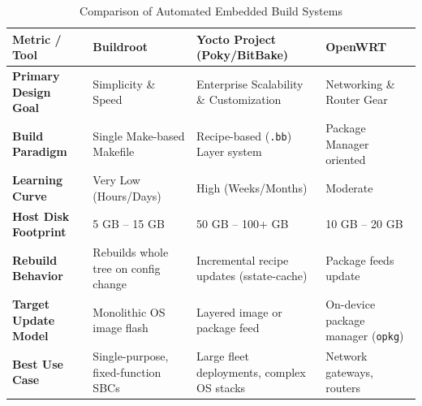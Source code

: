 \begin{table}[h!]
\centering
\caption{Comparison of Automated Embedded Build Systems}
\label{tab:build_tools}
\small
\begin{tabularx}{\textwidth}{l X X X}
\toprule
\textbf{Metric / Tool} & \textbf{Buildroot} & \textbf{Yocto Project (Poky/BitBake)} & \textbf{OpenWRT} \\
\midrule
\textbf{Primary Design Goal} & Simplicity \& Speed & Enterprise Scalability \& Customization & Networking \& Router Gear \\
\textbf{Build Paradigm} & Single Make-based Makefile & Recipe-based (\texttt{.bb}) Layer system & Package Manager oriented \\
\textbf{Learning Curve} & Very Low (Hours/Days) & High (Weeks/Months) & Moderate \\
\textbf{Host Disk Footprint} & 5 GB -- 15 GB & 50 GB -- 100+ GB & 10 GB -- 20 GB \\
\textbf{Rebuild Behavior} & Rebuilds whole tree on config change & Incremental recipe updates (sstate-cache) & Package feeds update \\
\textbf{Target Update Model} & Monolithic OS image flash & Layered image or package feed & On-device package manager (\texttt{opkg}) \\
\textbf{Best Use Case} & Single-purpose, fixed-function SBCs & Large fleet deployments, complex OS stacks & Network gateways, routers \\
\bottomrule
\end{tabularx}
\end{table}

